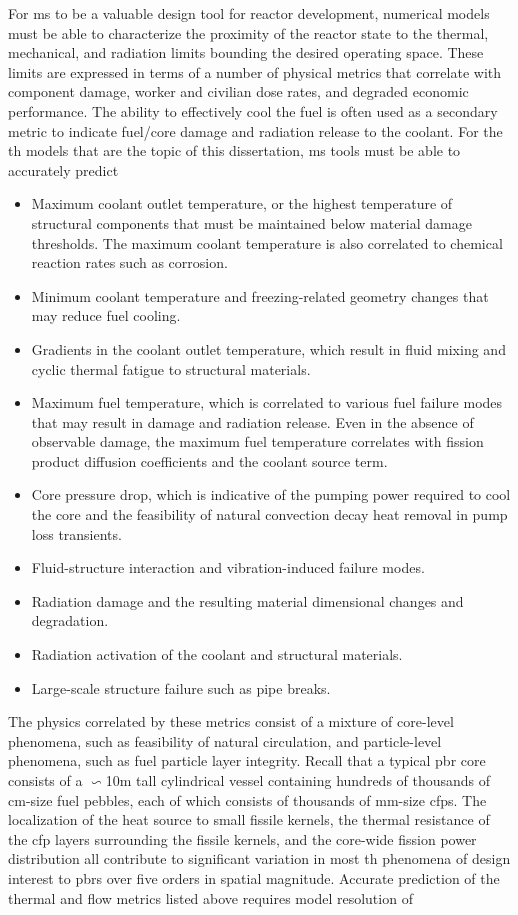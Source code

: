 For \gls{ms} to be a valuable design tool for reactor development, numerical models must be able to characterize the proximity of the reactor state to the thermal, mechanical, and radiation limits bounding the desired operating space. These limits are expressed in terms of a number of physical metrics that correlate with component damage, worker and civilian dose rates, and degraded economic performance. The ability to effectively cool the fuel is often used as a secondary metric to indicate fuel/core damage and radiation release to the coolant. For the \gls{th} models that are the topic of this dissertation, \gls{ms} tools must be able to accurately predict

\begin{itemize}
\item Maximum coolant outlet temperature, or the highest temperature of structural components that must be maintained below material damage thresholds. The maximum coolant temperature is also correlated to chemical reaction rates such as corrosion.
\item Minimum coolant temperature and freezing-related geometry changes that may reduce fuel cooling.
\item Gradients in the coolant outlet temperature, which result in fluid mixing and cyclic thermal fatigue to structural materials.
\item Maximum fuel temperature, which is correlated to various fuel failure modes that may result in damage and radiation release. Even in the absence of observable damage, the maximum fuel temperature correlates with fission product diffusion coefficients and the coolant source term.
\item Core pressure drop, which is indicative of the pumping power required to cool the core and the feasibility of natural convection decay heat removal in pump loss transients.
\item Fluid-structure interaction and vibration-induced failure modes.
\item Radiation damage and the resulting material dimensional changes and degradation.
\item Radiation activation of the coolant and structural materials.
\item Large-scale structure failure such as pipe breaks.
\end{itemize}

The physics correlated by these metrics consist of a mixture of core-level phenomena, such as feasibility of natural circulation, and particle-level phenomena, such as fuel particle layer integrity. Recall that a typical \gls{pbr} core consists of a $\backsim$10\si{\meter} tall cylindrical vessel containing hundreds of thousands of \si{\centi\meter}-size fuel pebbles, each of which consists of thousands of \si{\milli\meter}-size \glspl{cfp}. The localization of the heat source to small fissile kernels, the thermal resistance of the \gls{cfp} layers surrounding the fissile kernels, and the core-wide fission power distribution all contribute to significant variation in most \gls{th} phenomena of design interest to \glspl{pbr} over five orders in spatial magnitude. Accurate prediction of the thermal and flow metrics listed above requires model resolution of

